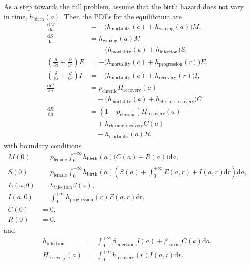 \documentclass[12pt]{article}
\newcommand{\md}{\mathrm{d}}
\begin{document}
As a step towards the full problem, assume that the birth hazard does
not vary in time, $h_{\text{birth}}(a)$.
Then the PDEs for the equilibrium are
\begin{equation}
  \begin{split}
    \frac{\md M}{\md a}
    &= - \big(h_{\text{mortality}}(a)
    + h_{\text{waning}}(a)\big) M,
    \\
    \frac{\md S}{\md a}
    &= h_{\text{waning}}(a) M
    \\ & \quad {}
    - \big(h_{\text{mortality}}(a)
      + h_{\text{infection}}
    \big) S,
    \\
    \left(
      \frac{\partial}{\partial a}
      + \frac{\partial}{\partial r}
    \right) E
    &=- \big(h_{\text{mortality}}(a)
    + h_{\text{progression}}(r)\big) E,
    \\
    \left(
      \frac{\partial}{\partial a}
      + \frac{\partial}{\partial r}
    \right) I
    &= - \big(h_{\text{mortality}}(a)
    + h_{\text{recovery}}(r)\big) I,
    \\
    \frac{\md C}{\md a}
    &= p_{\text{chronic}} H_{\text{recovery}}(a)
    \\ & \quad {}
    - \big(h_{\text{mortality}}(a)
    + h_{\text{chronic recovery}}\big) C,
    \\
    \frac{\md R}{\md a}
    &= (1 - p_{\text{chronic}}) H_{\text{recovery}}(a)
    \\ & \quad {}
    + h_{\text{chronic recovery}} C(a)
    \\ & \quad {}
    - h_{\text{mortality}}(a) R,
  \end{split}
\end{equation}
with boundary conditions
\begin{equation}
  \begin{split}
    M(0)
    &= p_{\text{female}}
    \int_0^{+\infty} h_{\text{birth}}(a)
    \big(C(a) + R(a)\big) \md a,
    \\
    S(0)
    &= p_{\text{female}}
    \int_0^{+\infty} h_{\text{birth}}(a)
    \left(S(a) +
    \int_0^{+\infty}E(a, r) + I(a, r) \md r\right) \md a,
    \\
    E(a, 0)
    &= h_{\text{infection}} S(a),
    \\
    I(a, 0)
    &= \int_0^{+\infty}h_{\text{progression}}(r) E(a, r) \md r,
    \\
    C(0) &= 0,
    \\
    R(0) &= 0,
  \end{split}
\end{equation}
and
\begin{equation}
  \begin{split}
    h_{\text{infection}}
    &= \int_0^{+\infty} \beta_{\text{infectious}} I(a)
    + \beta_{\text{carrier}} C(a) \md a,
    \\
    H_{\text{recovery}}(a)
    &= \int_0^{+\infty}h_{\text{recovery}}(r) I(a, r) \md r.
  \end{split}
\end{equation}
\end{document}
